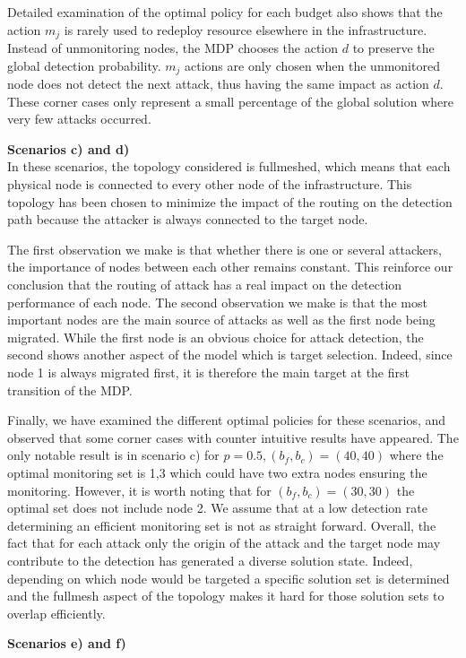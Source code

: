 Detailed examination of the optimal policy for each budget also shows that the action $m_j$ is rarely used to redeploy resource elsewhere in the infrastructure.
Instead of unmonitoring nodes, the MDP chooses the action $d$  to preserve the global detection probability.
$m_j$ actions are only chosen when the unmonitored node does not detect the next attack, thus having the same impact as action $d$. These corner cases only represent a small percentage of the global solution where very few attacks occurred.

\textbf{Scenarios c) and d) \\}
In these scenarios, the topology considered is fullmeshed, which means that each physical node is connected to every other node of the infrastructure. This topology has been chosen to minimize the impact of the routing on the detection path because the attacker is always connected to the target node.

The first observation we make is that whether there is one or several attackers, the importance of nodes between each other remains constant. This reinforce our conclusion that the routing of attack has a real impact on the detection performance of each node.
The second observation we make is that the most important nodes are the main source of attacks as well as the first node being migrated. While the first node is an obvious choice for attack detection, the second shows another aspect of the model which is target selection. Indeed, since node 1 is always migrated first, it is therefore the main target at the first transition of the MDP.

Finally, we have examined the different optimal policies for these scenarios, and observed that some corner cases with counter intuitive results have appeared. The only notable result is in scenario c) for $p=0.5,  (b_f,b_c) = (40,40)$ where the optimal monitoring set is 1,3 which could have two extra nodes ensuring the monitoring. However, it is worth noting that for $(b_f,b_c)=(30,30)$ the optimal set does not include node 2. We assume that at a low detection rate determining an efficient monitoring set is not as straight forward.
Overall, the fact that for each attack only the origin of the attack and the target node may contribute to the detection has generated a diverse solution state. Indeed, depending on which node would be targeted a specific solution set is determined and the fullmesh aspect of the topology makes it hard for those solution sets to overlap efficiently.

\textbf{Scenarios e) and f) \\}

